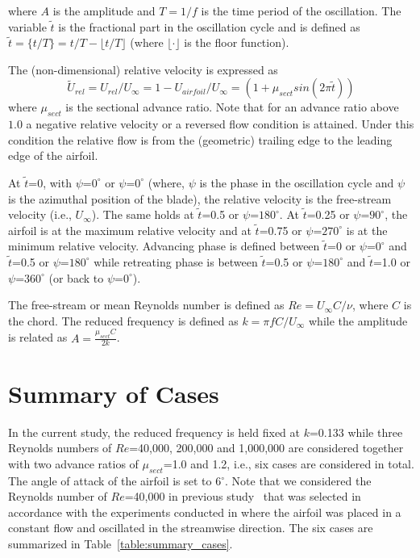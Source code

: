 \noindent where $A$ is the amplitude and $T=1/f$ is the time period of the oscillation.
The variable $\tilde{t}$ is the fractional part in the oscillation cycle and is defined as $\tilde{t}=\{t/T\} = t/T - \lfloor t/T \rfloor$ (where $\lfloor \cdot \rfloor$ is the floor function).

The (non-dimensional) relative velocity is expressed as
\begin{equation}
\label{eq:relVelocity}
  \tilde{U}_{rel} = U_{rel}/U_\infty = 1 - U_{airfoil}/U_\infty = (1+\mu_{sect} sin(2\pi\tilde{t}))
\end{equation}
\noindent where $\mu_{sect}$ is the sectional advance ratio.
Note that for an advance ratio above $1.0$ a negative relative velocity or a reversed flow condition is attained.
Under this condition the relative flow is from the (geometric) trailing edge to the leading edge of the airfoil.

At $\tilde{t}$=0, with $\psi$=$0^\circ$ or $\psi$=$0^\circ$ (where, $\psi$ is the phase in the oscillation cycle and $\psi$ is the azimuthal position of the blade), the relative velocity is the free-stream velocity (i.e., $U_\infty$).
The same holds at $\tilde{t}$=0.5 or $\psi$=$180^\circ$.
At $\tilde{t}$=0.25 or $\psi$=$90^\circ$, the airfoil is at the maximum relative velocity and at $\tilde{t}$=0.75 or $\psi$=$270^\circ$ is at the minimum relative velocity.
Advancing phase is defined between $\tilde{t}$=0 or $\psi$=$0^\circ$ and $\tilde{t}$=0.5 or $\psi$=$180^\circ$ while retreating phase is between $\tilde{t}$=0.5 or $\psi$=$180^\circ$ and $\tilde{t}$=1.0 or $\psi$=$360^\circ$ (or back to $\psi$=$0^\circ$).

The free-stream or mean Reynolds number is defined as $Re=U_\infty C/\nu$, where $C$ is the chord.
The reduced frequency is defined as $k=\pi f C/U_\infty$ while the amplitude is related as $A = \frac{\mu_{sect} C}{2k}$.

\section{Summary of Cases}
\label{sec:baseline_case_summary}

In the current study, the reduced frequency is held fixed at $k$=0.133 while three Reynolds numbers of $Re$=40,000, 200,000 and 1,000,000 are considered together with two advance ratios of $\mu_{sect}$=1.0 and 1.2, i.e., six cases are considered in total.
The angle of attack of the airfoil is set to 6$^\circ$.
Note that we considered the Reynolds number of $Re$=40,000 in previous study~\cite{bib:kocher_scitech2017} that was selected in accordance with the experiments conducted in \cite{bib:granlund2016} where the airfoil was placed in a constant flow and oscillated in the streamwise direction.
The six cases are summarized in Table~\ref{table:summary_cases}.

